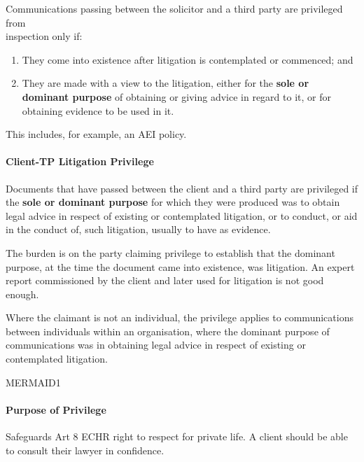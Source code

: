 \documentclass[
]{article}
\providecommand{\tightlist}{%
  \setlength{\itemsep}{0pt}\setlength{\parskip}{0pt}}
\begin{document}
Communications passing between the solicitor and a third party are
privileged from\\
inspection only if:

\begin{enumerate}
\def\labelenumi{\arabic{enumi}.}
\tightlist
\item
  They come into existence after litigation is contemplated or
  commenced; and
\item
  They are made with a view to the litigation, either for the
  \textbf{sole or dominant purpose} of obtaining or giving advice in
  regard to it, or for obtaining evidence to be used in it.
\end{enumerate}

This includes, for example, an AEI policy.

\hypertarget{client-tp-litigation-privilege}{%
\paragraph{Client-TP Litigation
Privilege}\label{client-tp-litigation-privilege}}

Documents that have passed between the client and a third party are
privileged if the \textbf{sole or dominant purpose} for which they were
produced was to obtain legal advice in respect of existing or
contemplated litigation, or to conduct, or aid in the conduct of, such
litigation, usually to have as evidence.

The burden is on the party claiming privilege to establish that the
dominant purpose, at the time the document came into existence, was
litigation. An expert report commissioned by the client and later used
for litigation is not good enough.

Where the claimant is not an individual, the privilege applies to
communications between individuals within an organisation, where the
dominant purpose of communications was in obtaining legal advice in
respect of existing or contemplated litigation.

MERMAID1

\hypertarget{purpose-of-privilege}{%
\paragraph{Purpose of Privilege}\label{purpose-of-privilege}}

Safeguards Art 8 ECHR right to respect for private life. A client should
be able to consult their lawyer in confidence.
\end{document}
